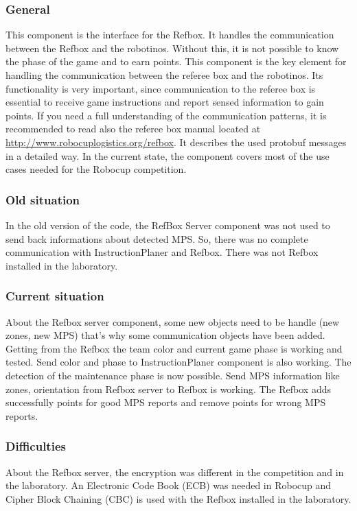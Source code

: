 
\subsubsection{General}

This component is the interface for the Refbox. It handles the communication between the Refbox and the robotinos. Without this, it is not possible to know the phase of the game and to earn points. This component is the key element for handling the communication between the referee box and the robotinos. Its functionality is very important, since communication to the referee box is essential to receive game instructions and report sensed information to gain points. If you need a full understanding of the communication patterns, it is recommended to read also the referee box manual located at \url{http://www.robocuplogistics.org/refbox}. It describes the used protobuf messages in a detailed way. In the current state, the component covers most of the use cases needed for the Robocup competition.
 

\subsubsection{Old situation}

In the old version of the code, the RefBox Server component was not used to send back informations about detected MPS. So, there was no complete communication with InstructionPlaner and Refbox. There was not Refbox installed in the laboratory. 


\subsubsection{Current situation}

About the Refbox server component, some new objects need to be handle (new zones, new MPS) that’s why some communication objects have been added. Getting from the Refbox the team color and current game phase is working and tested. Send color and phase to InstructionPlaner component is also working. The detection of the maintenance phase is now possible. Send MPS information like zones, orientation from Refbox server to Refbox is working. The Refbox adds successfully points for good MPS reports and remove points for wrong MPS reports.


\subsubsection{Difficulties}

About the Refbox server, the encryption was different in the competition and in the laboratory. An Electronic Code Book (ECB) was needed in Robocup and Cipher Block Chaining (CBC) is used with the Refbox installed in the laboratory.
